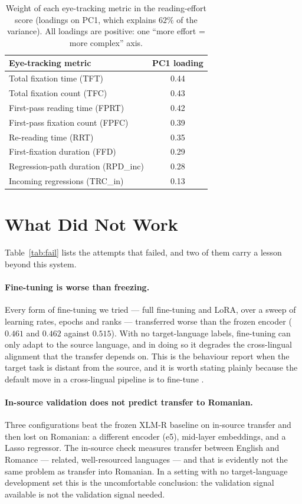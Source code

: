 \begin{table}[tbp]
\centering\small
\begin{tabular}{lc}
\toprule
\textbf{Eye-tracking metric} & \textbf{PC1 loading} \\
\midrule
Total fixation time (TFT) & 0.44 \\
Total fixation count (TFC) & 0.43 \\
First-pass reading time (FPRT) & 0.42 \\
First-pass fixation count (FPFC) & 0.39 \\
Re-reading time (RRT) & 0.35 \\
First-fixation duration (FFD) & 0.29 \\
Regression-path duration (RPD\_inc) & 0.28 \\
Incoming regressions (TRC\_in) & 0.13 \\
\bottomrule
\end{tabular}
\caption{Weight of each eye-tracking metric in the reading-effort score (loadings on PC1, which explains $62\%$ of
the variance). All loadings are positive: one ``more effort = more complex'' axis.}
\label{tab:pca}
\end{table}

\section{What Did Not Work}
\label{sec:negative}

Table~\ref{tab:fail} lists the attempts that failed, and two of them
carry a lesson beyond this system.

\paragraph{Fine-tuning is worse than freezing.}
Every form of fine-tuning we tried --- full fine-tuning and LoRA, over
a sweep of learning rates, epochs and ranks --- transferred worse than
the frozen encoder ($0.461$ and $0.462$ against $0.515$). With no
target-language labels, fine-tuning can only adapt to the source
language, and in doing so it degrades the cross-lingual alignment that
the transfer depends on. This is the behaviour \citet{peters-etal-2019-tune}
report when the target task is distant from the source, and it is worth
stating plainly because the default move in a cross-lingual pipeline is
to fine-tune \citep{pires-etal-2019-multilingual}.

\paragraph{In-source validation does not predict transfer to Romanian.}
Three configurations beat the frozen XLM-R baseline on in-source
transfer and then lost on Romanian: a different encoder (e5), mid-layer
embeddings, and a Lasso regressor. The in-source check measures
transfer between English and Romance --- related, well-resourced
languages --- and that is evidently not the same problem as transfer
into Romanian. In a setting with no target-language development set
this is the uncomfortable conclusion: the validation signal available
is not the validation signal needed.

